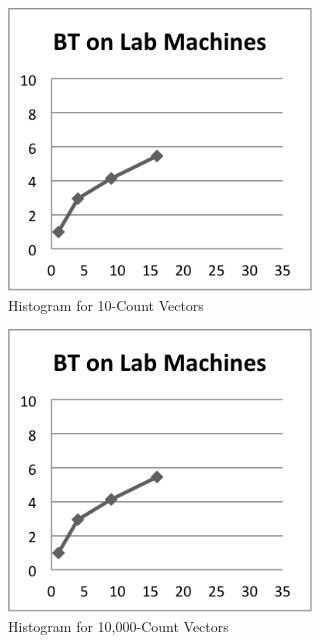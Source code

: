 \documentclass{acm_proc_article-sp}
\begin{document}
\begin{figure}[tbp]
  \centering
  \caption{Histogram for 10-Count Vectors}
	\label{hist10}
  \includegraphics[width=19pc]{Pics/BT.png}
\end{figure}

\begin{figure}[tbp]
  \centering
  \caption{Histogram for 10,000-Count Vectors}
	\label{hist10000}
  \includegraphics[width=19pc]{Pics/BT.png}
\end{figure}
\end{document}

